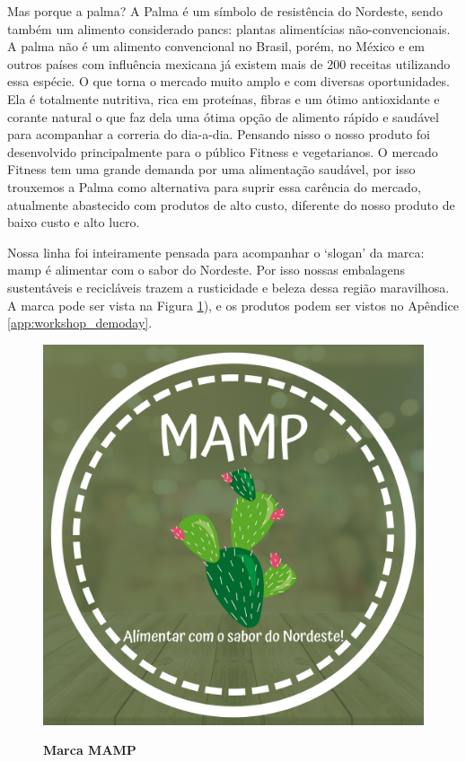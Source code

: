 Mas porque a palma? A Palma é um símbolo de resistência do Nordeste, sendo também um alimento considerado pancs: plantas alimentícias não-convencionais. A palma não é um alimento convencional no Brasil, porém, no México e em outros países com influência mexicana já existem mais de 200 receitas utilizando essa espécie. O que torna o mercado muito amplo e com diversas oportunidades. Ela é totalmente nutritiva, rica em proteínas, fibras e um ótimo antioxidante e corante natural o que faz dela uma ótima opção de alimento rápido e saudável para acompanhar a correria do dia-a-dia.
Pensando nisso o nosso produto foi desenvolvido principalmente para o público Fitness e vegetarianos. O mercado Fitness tem uma grande demanda por uma alimentação saudável, por isso trouxemos a Palma como alternativa para suprir essa carência do mercado, atualmente abastecido com produtos de alto custo, diferente do nosso produto de baixo custo e alto lucro.

Nossa linha foi inteiramente pensada para acompanhar o ‘slogan’ da marca: mamp é alimentar com o sabor do Nordeste. Por isso nossas embalagens sustentáveis e recicláveis trazem a rusticidade e beleza dessa região maravilhosa. A marca pode ser vista na Figura \ref{figura_22}), e os produtos podem ser vistos no Apêndice \ref{app:workshop_demoday}.


\begin{figure}[H]
\centering
\caption{\textbf{Marca MAMP}}
\includegraphics[scale=0.1]{Imagens/mamp.png}
\label{figura_22}
\end{figure}


